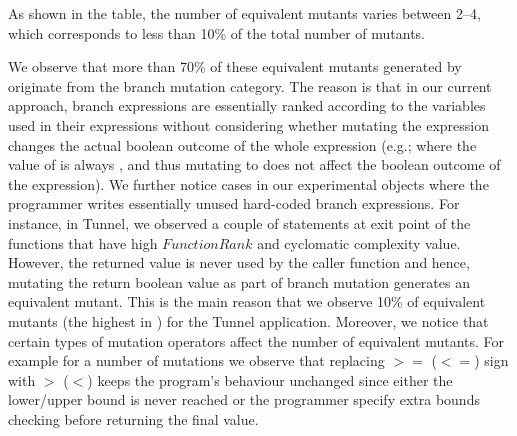 As shown in the table, the number of equivalent mutants varies between 2--4, which corresponds to less than 10\% of the total number of mutants.%


We observe that more than 70\% of these equivalent mutants generated by \mutandis originate from the branch mutation category. The reason is that in our current approach, branch expressions are essentially ranked according to the variables used in their expressions without considering whether mutating the expression changes the actual boolean outcome of the whole expression (e.g.;  where the value of  is always , and thus mutating  to  does not affect the boolean outcome of the expression). We further notice cases in our experimental objects where the programmer writes essentially unused hard-coded branch expressions.
For instance, in Tunnel, we observed a couple of  statements at exit point of the functions that have high $FunctionRank$ and cyclomatic complexity value. However, the returned value is never used by the caller function and hence, mutating the return boolean value as part of branch mutation generates an equivalent mutant. This is the main reason that we observe 10\% of equivalent mutants (the highest in ) for the Tunnel application. Moreover, we notice that certain types of mutation operators affect the number of equivalent mutants. For example for a number of mutations we observe that replacing $>=$ ($<=$) sign with $>$ ($<$) keeps the program's behaviour unchanged since either the lower/upper bound is never reached or the programmer specify extra bounds checking before returning the final value.
  
